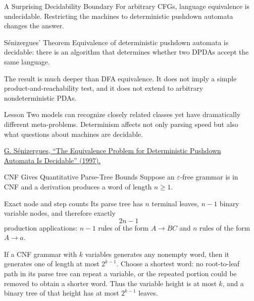\documentclass[10pt]{beamer}
\newcommand{\paperlink}[2]{%
  \href{#1}{\textcolor{blue!65!black}{#2}}%
}
\begin{document}
\begin{frame}{A Surprising Decidability Boundary}
  \small
  For arbitrary CFGs, language equivalence is undecidable. Restricting the
  machines to deterministic pushdown automata changes the answer.
  \pause
  \begin{block}{S\'enizergues' Theorem}
    Equivalence of deterministic pushdown automata is decidable: there is an
    algorithm that determines whether two DPDAs accept the same language.
  \end{block}
  \pause
  The result is much deeper than DFA equivalence. It does not imply a simple
  product-and-reachability test, and it does not extend to arbitrary
  nondeterministic PDAs.
  \begin{alertblock}{Lesson}
    Two models can recognize closely related classes yet have dramatically
    different meta-problems. Determinism affects not only parsing speed but
    also what questions about machines are decidable.
  \end{alertblock}

  \paperlink{https://doi.org/10.1007/3-540-63165-8_221}{G. S\'enizergues,
  ``The Equivalence Problem for Deterministic Pushdown Automata Is
  Decidable'' (1997).}
\end{frame}

\begin{frame}{CNF Gives Quantitative Parse-Tree Bounds}
  \small
  Suppose an $\varepsilon$-free grammar is in CNF and a derivation produces a
  word of length $n\ge1$.
  \pause
  \begin{block}{Exact node and step counts}
    Its parse tree has $n$ terminal leaves, $n-1$ binary variable nodes, and
    therefore exactly
    \[
      2n-1
    \]
    production applications: $n-1$ rules of the form $A\to BC$ and $n$ rules
    of the form $A\to a$.
  \end{block}
  \pause
  If a CNF grammar with $k$ variables generates any nonempty word, then it
  generates one of length at most $2^{k-1}$. Choose a shortest word: no
  root-to-leaf path in its parse tree can repeat a variable, or the repeated
  portion could be removed to obtain a shorter word. Thus the variable height
  is at most $k$, and a binary tree of that height has at most $2^{k-1}$
  leaves.
\end{frame}
\end{document}
